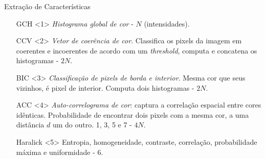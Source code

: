 \documentclass{beamer}
\begin{document}
\begin{frame}{Extração de Características}
\setlength\leftmargini{1.5em}
\begin{itemize}
\item[GCH]<1> {\emph{Histograma global de cor} - $N$ (intensidades).} %

\item[CCV]<2> {\emph{Vetor de coerência de cor}. Classifica os pixels da imagem em coerentes e incoerentes de acordo com um \textit{threshold}, computa e concatena os histogramas - $2N$.}

\item[BIC]<3> {\emph{Classificação de pixels de borda e interior}. Mesma cor que seus vizinhos, é pixel de interior. Computa dois histogramas - $2N$.}

\item[ACC]<4> {\emph{Auto-correlograma de cor}: captura a correlação espacial entre cores idênticas. Probabilidade de encontrar dois pixels com a mesma cor, a uma distância $d$ um do outro. 1, 3, 5 e 7 - $4N$.}

\item[Haralick]<5> {Entropia, homogeneidade, contraste, correlação, probabilidade máxima e uniformidade - $6$.}
\end{itemize}
\end{frame}
\end{document}
